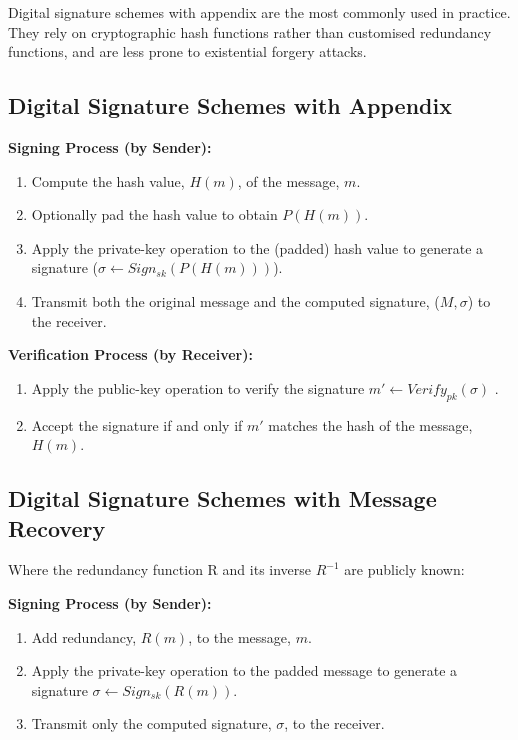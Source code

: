 \documentclass[]{final_report}
\theoremstyle{definition}
\begin{document}
Digital signature schemes with appendix are the most commonly used in practice. They rely on cryptographic hash functions rather than customised redundancy functions, and are less prone to existential forgery attacks.

\subsection{Digital Signature Schemes with Appendix}
\textbf{Signing Process (by Sender):}
\begin{enumerate}
    \item Compute the hash value, \( H(m) \), of the message, \( m \).
    \item Optionally pad the hash value to obtain \( P(H(m)) \).
    \item Apply the private-key operation to the (padded) hash value to generate a signature (\( \sigma \leftarrow Sign_{sk}(P(H(m))) \)).  
     \item Transmit both the original message and the computed signature, ($M, \sigma$) to the receiver.
\end{enumerate}

\textbf{Verification Process (by Receiver):}
\begin{enumerate}
    \item Apply the public-key operation to verify the signature \( m' \leftarrow Verify_{pk}(\sigma) \) .
    \item Accept the signature if and only if \( m' \) matches the hash of the message, \( H(m) \).
\end{enumerate}

\subsection{Digital Signature Schemes with Message Recovery}
Where the redundancy function R and its inverse $R^{-1}$ are publicly known:

\textbf{Signing Process (by Sender):}
\begin{enumerate}
    \item Add redundancy, \( R(m) \), to the message, \( m \).
    \item Apply the private-key operation to the padded message to generate a signature \( \sigma \leftarrow Sign_{sk}(R(m)) \).
    \item Transmit only the computed signature, \( \sigma \), to the receiver.
\end{enumerate}
\end{document}
